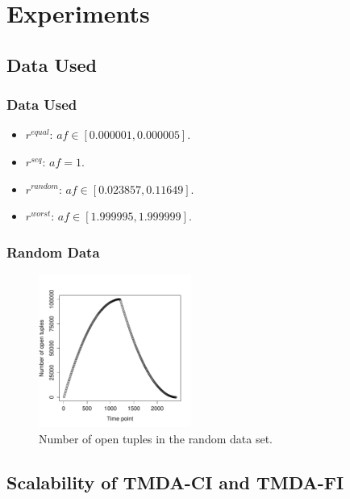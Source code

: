 \documentclass[]{beamer}
\begin{document}
\section{Experiments}

\subsection{Data Used}
\begin{frame}
  \frametitle{Data Used}   %
  \begin{itemize}
  \item
  $r^{equal}$: $af \in [0.000001, 0.000005]$.
  \item
  $r^{seq}$: $af=1$.
  \item
  $r^{random}$: $af \in [0.023857, 0.11649]$.
  \item
  $r^{worst}$: $af \in [1.999995, 1.999999]$.
  \end{itemize}
\end{frame}


\begin{frame}
  \frametitle{Random Data}   %

  \begin{figure}[ht!]
\centering 
\includegraphics[width=50mm]{../graphs/random_open_tuples.pdf}
\caption{Number of open tuples in the random data set.}
\label{open_tuples} 
\end{figure}


\end{frame}

\subsection{Scalability of TMDA-CI and TMDA-FI}
\end{document}
